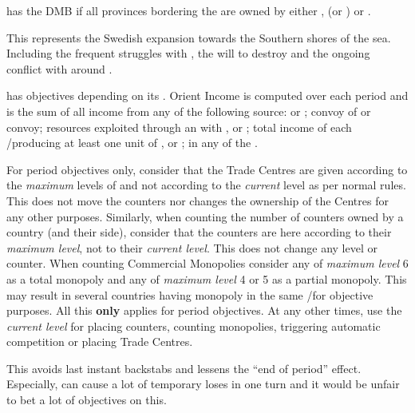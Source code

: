  \SUE has the DMB if all provinces
bordering the  are owned by either \SUE,
 (or \PRU) or .

\begin{histoire}
  This represents the Swedish expansion towards the Southern shores of
  the sea. Including the frequent struggles with \POL, the will to
  destroy \paysHanse and the ongoing conflict with \RUS around
  \provinceIngria.
\end{histoire}

 \VEN has objectives depending on its
. Orient Income is computed over each period and is
the sum of all income from any of the following source:
\bparag {} or ;
\bparag convoy of  or  convoy;
\bparag resources exploited through an \dipAT with \paysaden, \paysoman
or \paysgujarat;
\bparag total income of each \COL/\TP producing at least one unit of
,  or ;
\bparag \TradeFLEET in any \STZ of the .

For period objectives only, consider that the Trade Centres are given
according to the \emph{maximum} levels of \TradeFLEET and not according
to the \emph{current} level as per normal rules.
\bparag This does not move the counters nor changes the ownership of the
Centres for any other purposes.
\bparag Similarly, when counting the number of \TradeFLEET counters
owned by a country (and their side), consider that the counters are here
according to their \emph{maximum level}, not to their \emph{current
  level}. This does not change any \TradeFLEET level or counter.
\bparag When counting Commercial Monopolies consider any \TradeFLEET
of \emph{maximum level} 6 as a total monopoly and any \TradeFLEET of
\emph{maximum level} 4 or 5 as a partial monopoly. This may result in
several countries having monopoly in the same \CTZ/\STZ for objective
purposes.
\bparag All this \textbf{only} applies for period objectives. At any
other times, use the \emph{current level} for placing counters, counting
monopolies, triggering automatic competition or placing Trade Centres.

\begin{designnote}
  This avoids last instant backstabs and lessens the ``end of period''
  effect. Especially, \corsaire can cause a lot of temporary loses in
  one turn and it would be unfair to bet a lot of objectives \VPs on
  this.
\end{designnote}

